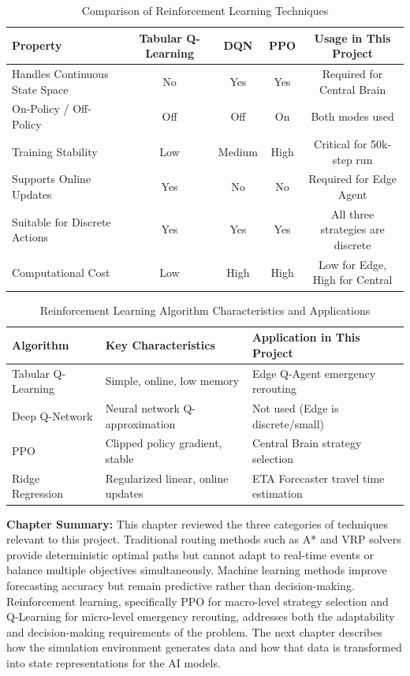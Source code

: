 \begin{table}[h!]
\centering
\caption{Comparison of Reinforcement Learning Techniques}
\label{tab:rl_comparison}
\begin{tabular}{|l|c|c|c|c|}
\hline
\textbf{Property} & \textbf{Tabular Q-Learning} & \textbf{DQN} & \textbf{PPO} & \textbf{Usage in This Project} \\
\hline
Handles Continuous State Space   & No  & Yes & Yes & Required for Central Brain \\
\hline
On-Policy / Off-Policy           & Off & Off & On  & Both modes used \\
\hline
Training Stability               & Low & Medium & High & Critical for 50k-step run \\
\hline
Supports Online Updates          & Yes & No  & No  & Required for Edge Agent \\
\hline
Suitable for Discrete Actions    & Yes & Yes & Yes & All three strategies are discrete \\
\hline
Computational Cost               & Low & High & High & Low for Edge, High for Central \\
\hline
\end{tabular}
\end{table}

\begin{table}[h!]
\centering
\caption{Reinforcement Learning Algorithm Characteristics and Applications}
\label{tab:rl_apps}
\begin{tabular}{|l|l|l|}
\hline
\textbf{Algorithm} & \textbf{Key Characteristics} & \textbf{Application in This Project} \\
\hline
Tabular Q-Learning & Simple, online, low memory & Edge Q-Agent emergency rerouting \\
\hline
Deep Q-Network & Neural network Q-approximation & Not used (Edge is discrete/small) \\
\hline
PPO & Clipped policy gradient, stable & Central Brain strategy selection \\
\hline
Ridge Regression & Regularized linear, online updates & ETA Forecaster travel time estimation \\
\hline
\end{tabular}
\end{table}

\vspace{1cm}
\noindent \textbf{Chapter Summary:} This chapter reviewed the three categories of
techniques relevant to this project. Traditional routing methods such as A* and
VRP solvers provide deterministic optimal paths but cannot adapt to real-time
events or balance multiple objectives simultaneously. Machine learning methods
improve forecasting accuracy but remain predictive rather than decision-making.
Reinforcement learning, specifically PPO for macro-level strategy selection and
Q-Learning for micro-level emergency rerouting, addresses both the adaptability
and decision-making requirements of the problem. The next chapter describes how
the simulation environment generates data and how that data is transformed into
state representations for the AI models.
